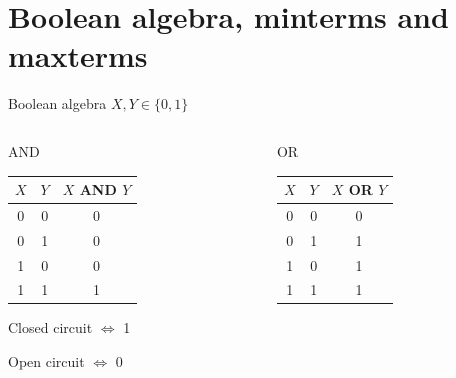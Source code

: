 \documentclass[presentation,aspectratio=1610]{beamer}
\begin{document}
\section{Boolean algebra, minterms and maxterms}
\label{sec:org7d592ef}
\begin{frame}[label={sec:orgf5ab4de}]{Boolean algebra}
\(X, Y \in \{0,1\}\)
\begin{columns}
\begin{column}{0.5\columnwidth}
\begin{block}{AND}
\begin{center}
\begin{tabular}{|cc|c|}
\hline
\(X\) & \(Y\) & \(X\) AND \(Y\)\\
\hline
0 & 0 & 0\\
0 & 1 & 0\\
1 & 0 & 0\\
1 & 1 & 1\\
\hline
\end{tabular}
\end{center}

\begin{center}
\end{center}
\alert{Closed circuit \(\Leftrightarrow\) 1}

\alert{Open circuit \(\Leftrightarrow\) 0}
\end{block}
\end{column}

\begin{column}{0.5\columnwidth}
\begin{block}{OR}
\begin{center}
\begin{tabular}{|cc|c|}
\hline
\(X\) & \(Y\) & \(X\) OR \(Y\)\\
\hline
0 & 0 & 0\\
0 & 1 & 1\\
1 & 0 & 1\\
1 & 1 & 1\\
\hline
\end{tabular}
\end{center}

\begin{center}
\end{center}
\end{block}
\end{column}
\end{columns}
\end{frame}
\end{document}
